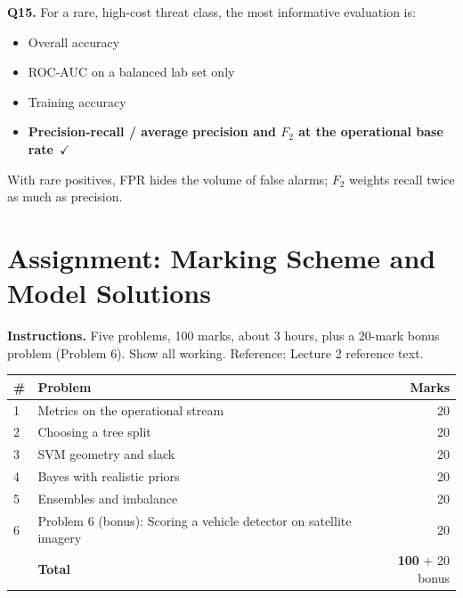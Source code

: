 \documentclass[11pt]{article}
\begin{document}
{\noindent\textbf{Q15.} For a rare, high-cost threat class, the most informative evaluation is:\begin{itemize}[leftmargin=2.2em,itemsep=0pt,topsep=1pt]\item[A.] Overall accuracy\item[B.] ROC-AUC on a balanced lab set only\item[C.] Training accuracy\item[\textbf{D.}] \textbf{Precision-recall / average precision and $F_2$ at the operational base rate}~{\color{GrnN}$\checkmark$}\end{itemize} With rare positives, FPR hides the volume of false alarms; $F_2$ weights recall twice as much as precision.\par\medskip

}

\section{Assignment: Marking Scheme and Model Solutions}

\textbf{Instructions.} Five problems, 100 marks, about 3 hours, plus a 20-mark bonus problem (Problem 6). Show all working. Reference: Lecture 2 reference text.

\begin{center}\small\renewcommand{\arraystretch}{1.25}\begin{tabularx}{0.85\textwidth}{@{}l X r@{}}\toprule\textbf{\#} & \textbf{Problem} & \textbf{Marks}\\\midrule1 & Metrics on the operational stream & 20\\
2 & Choosing a tree split & 20\\
3 & SVM geometry and slack & 20\\
4 & Bayes with realistic priors & 20\\
5 & Ensembles and imbalance & 20\\
6 & Problem 6 (bonus): Scoring a vehicle detector on satellite imagery & 20\\\midrule & \textbf{Total} & \textbf{100} + 20 bonus\\\bottomrule\end{tabularx}\end{center}
\end{document}
